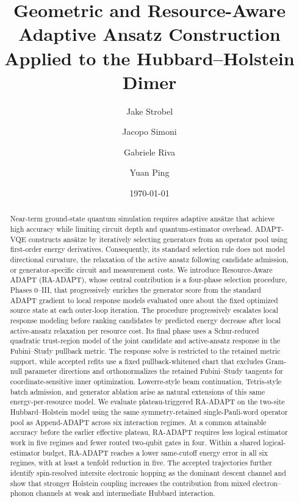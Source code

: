 \documentclass[
  reprint,
  amsmath,
  amssymb,
  aps,
  pra,
  nofootinbib,
  superscriptaddress,
  floatfix
]{revtex4-2}
\begin{document}
\makeatletter
\def\bibsection{\section*{\refname}\@nobreaktrue}
\makeatother

\title{Geometric and Resource-Aware Adaptive Ansatz Construction Applied to the Hubbard--Holstein Dimer}

\author{Jake Strobel}
\author{Jacopo Simoni}
\author{Gabriele Riva}
\author{Yuan Ping}

\date{\today}

\begin{abstract}
Near-term ground-state quantum simulation requires adaptive ansätze that
achieve high accuracy while limiting circuit depth and quantum-estimator
overhead. ADAPT-VQE constructs ansätze by iteratively selecting generators
from an operator pool using first-order energy derivatives. Consequently, its
standard selection rule does not model directional curvature, the relaxation
of the active ansatz following candidate admission, or generator-specific
circuit and measurement costs. We introduce Resource-Aware ADAPT (RA-ADAPT),
whose central contribution is a four-phase selection procedure, Phases 0--III,
that progressively enriches the generator score from the standard ADAPT
gradient to local response models evaluated once about the fixed optimized
source state at each outer-loop iteration. The procedure progressively
escalates local response modeling before ranking candidates by predicted energy
decrease after local active-ansatz relaxation per resource cost. Its final phase uses a Schur-reduced quadratic
trust-region model of the joint candidate and active-ansatz response in the
Fubini--Study pullback metric. The response solve is restricted to the retained
metric support, while accepted refits use a fixed pullback-whitened chart that
excludes Gram-null parameter directions and orthonormalizes the retained
Fubini--Study tangents for coordinate-sensitive inner optimization.
Lowerre-style beam continuation, Tetris-style batch admission, and generator
ablation arise as natural extensions of this same energy-per-resource model.
We evaluate plateau-triggered RA-ADAPT on the two-site Hubbard--Holstein model
using the same symmetry-retained single-Pauli-word operator pool as
Append-ADAPT across six interaction regimes. At a common attainable accuracy
before the earlier effective plateau, RA-ADAPT requires less logical estimator
work in five regimes and fewer routed two-qubit gates in four. Within a shared
logical-estimator budget, RA-ADAPT reaches a lower same-cutoff energy error in
all six regimes, with at least a tenfold reduction in five. The accepted
trajectories further identify spin-resolved intersite electronic hopping as
the dominant descent channel and show that stronger Holstein coupling
increases the contribution from mixed electron--phonon channels at weak and
intermediate Hubbard interaction.


\end{abstract}
\end{document}
